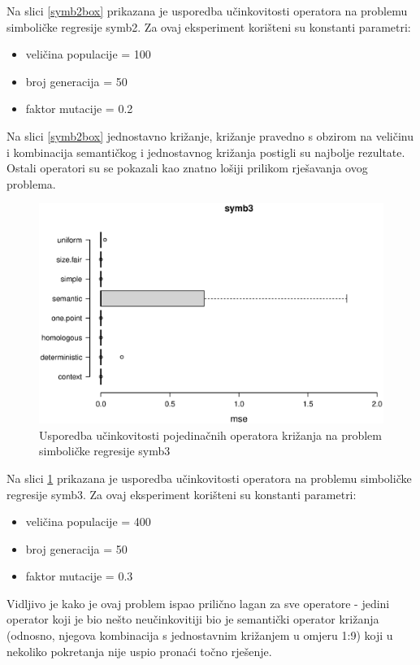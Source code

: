 Na slici \ref{symb2box} prikazana je usporedba učinkovitosti operatora na problemu simboličke regresije symb2. Za ovaj eksperiment korišteni su konstanti parametri:
\begin{itemize}
\item{veličina populacije = 100}
\item{broj generacija = 50}
\item{faktor mutacije = 0.2}
\end{itemize} 

Na slici \ref{symb2box} jednostavno križanje, križanje pravedno s obzirom na veličinu i kombinacija semantičkog i jednostavnog križanja postigli su najbolje rezultate. Ostali operatori su se pokazali kao znatno lošiji prilikom rješavanja ovog problema.


\begin{figure}[H]
	\centering
	\includegraphics[trim=0cm 4cm 0cm 0cm, scale=0.6]{./slike/boxPlots/symb3.eps}
	\caption{Usporedba učinkovitosti pojedinačnih operatora križanja na problem simboličke regresije symb3}
	\label{symb3box}
\end{figure}

Na slici \ref{symb3box} prikazana je usporedba učinkovitosti operatora na problemu simboličke regresije symb3. Za ovaj eksperiment korišteni su konstanti parametri:
\begin{itemize}
\item{veličina populacije = 400}
\item{broj generacija = 50}
\item{faktor mutacije = 0.3}
\end{itemize} 

Vidljivo je kako je ovaj problem ispao prilično lagan za sve operatore - jedini operator koji je bio nešto neučinkovitiji bio je semantički operator križanja (odnosno, njegova kombinacija s jednostavnim križanjem u omjeru 1:9) koji u nekoliko pokretanja nije uspio pronaći točno rješenje.


